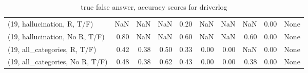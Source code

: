 \begin{table*}[h!]
\begin{adjustbox}{width=2\columnwidth,center}
\begin{tabular}{lrrr|rrr|rrr}
(19, hallucination, R, T/F)           &                       NaN &                   NaN &                       NaN &                          0.20 &                       NaN &                           NaN &                                    NaN &                               0.00 &                                  None \\
(19, hallucination, No R, T/F)        &                      0.80 &                   NaN &                       NaN &                          0.60 &                       NaN &                           NaN &                                   0.60 &                               0.00 &                                  None \\
(19, all\_categories, R, T/F)          &                      0.42 &                  0.38 &                      0.50 &                          0.33 &                      0.00 &                          0.00 &                                    NaN &                               0.00 &                                  None \\
(19, all\_categories, No R, T/F)       &                      0.48 &                  0.38 &                      0.62 &                          0.43 &                      0.00 &                          0.00 &                                   0.38 &                               0.00 &                                  None \\


\bottomrule
\end{tabular}
\end{adjustbox}
\caption{true false answer, accuracy scores for driverlog}
\end{table*}